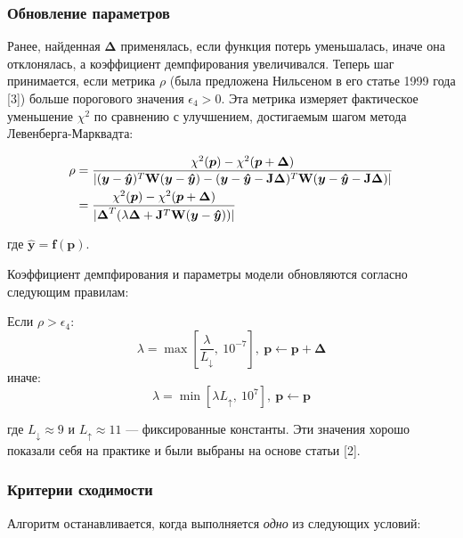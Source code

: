 \subsubsection{Обновление параметров}

Ранее, найденная $\boldsymbol{\Delta}$ применялась, если функция потерь уменьшалась, иначе она отклонялась, а коэффициент демпфирования увеличивался. Теперь шаг принимается, если метрика $\rho$ (была предложена Нильсеном в его статье 1999 года [3]) больше порогового значения $\epsilon_4 > 0$. Эта метрика измеряет фактическое уменьшение $\chi^2$ по сравнению с улучшением, достигаемым шагом метода Левенберга-Марквадта:

\[
	\begin{aligned}
		\rho & = \frac{\chi^2(\boldsymbol p) - \chi^2(\boldsymbol p + \boldsymbol\Delta)}
		{|(\boldsymbol{y}-\boldsymbol{\hat{y}})^T\mathbf{W}(\boldsymbol{y}-\boldsymbol{\hat{y}}) - (\boldsymbol{y}-\boldsymbol{\hat{y}}-\mathbf{J}\boldsymbol{\Delta})^T\mathbf{W}(\boldsymbol{y}-\boldsymbol{\hat{y}}-\mathbf{J}\boldsymbol{\Delta})|} \notag \\
		     & =\frac{\chi^2(\boldsymbol p) - \chi^2(\boldsymbol p + \boldsymbol\Delta)}
		{|\boldsymbol{\Delta}^T(\lambda\boldsymbol{\Delta} + \mathbf{J}^T\mathbf{W}(\boldsymbol{y}-\boldsymbol{\hat{y}}))|}\notag                                                                                                                              \\
	\end{aligned}
\]

где $\boldsymbol{\hat{y}} = \mathbf{f}(\boldsymbol{p})$.

Коэффициент демпфирования и параметры модели обновляются согласно следующим правилам:

Если $\rho > \epsilon_4$:
\[
	\lambda = \max\left[\frac{\lambda}{L_\downarrow},\:10^{-7}\right],\:\mathbf{p} \gets \mathbf{p} + \boldsymbol{\Delta}
\]
иначе:
\[
	\lambda = \min\left[\lambda L_\uparrow,\:10^{7}\right],\:\mathbf{p} \gets \mathbf{p}
\]

где $L_\downarrow\approx 9$ и $L_\uparrow\approx 11$ — фиксированные константы. Эти значения хорошо показали себя на практике и были выбраны на основе статьи [2].

\subsubsection{Критерии сходимости}

Алгоритм останавливается, когда выполняется \textit{одно} из следующих условий:

